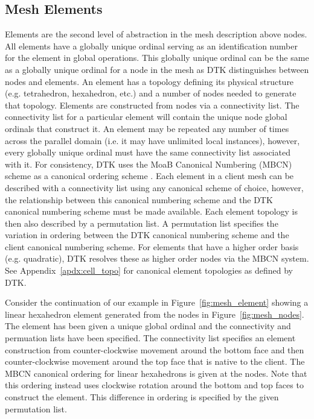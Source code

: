 \documentclass[letterpaper,12pt]{article}
\begin{document}
\subsection{Mesh Elements}\label{subsec:elements}
Elements are the second level of abstraction in the mesh description
above nodes. All elements have a globally unique ordinal serving as an
identification number for the element in global operations. This
globally unique ordinal can be the same as a globally unique ordinal
for a node in the mesh as DTK distinguishes between nodes and
elements. An element has a topology defining its physical structure
(e.g. tetrahedron, hexahedron, etc.) and a number of nodes needed to
generate that topology. Elements are constructed from nodes via a
connectivity list. The connectivity list for a particular element will
contain the unique node global ordinals that construct it. An element
may be repeated any number of times across the parallel domain
(i.e. it may have unlimited local instances), however, every globally
unique ordinal must have the same connectivity list associated with
it. For consistency, DTK uses the MoaB Canonical Numbering (MBCN)
scheme as a canonical ordering scheme \cite{Tautges_2009}. Each
element in a client mesh can be described with a connectivity list
using any canonical scheme of choice, however, the relationship
between this canonical numbering scheme and the DTK canonical
numbering scheme must be made available. Each element topology is then
also described by a permutation list. A permutation list specifies the
variation in ordering between the DTK canonical numbering scheme and
the client canonical numbering scheme. For elements that have a higher
order basis (e.g. quadratic), DTK resolves these as higher order nodes
via the MBCN system. See Appendix~\ref{apdx:cell_topo} for canonical
element topologies as defined by DTK.

Consider the continuation of our example in
Figure~\ref{fig:mesh_element} showing a linear hexahedron element
generated from the nodes in Figure~\ref{fig:mesh_nodes}. The element
has been given a unique global ordinal and the connectivity and
permuation lists have been specified. The connectivity list specifies
an element construction from counter-clockwise movement around the
bottom face and then counter-clockwise movement around the top face
that is native to the client. The MBCN canonical ordering for linear
hexahedrons is given at the nodes. Note that this ordering instead
uses clockwise rotation around the bottom and top faces to construct
the element. This difference in ordering is specified by the given
permutation list.
\end{document}
